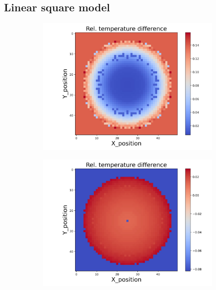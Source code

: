 \subsection{Linear square model}
\begin{figure}[h]
    \centering
    \begin{minipage}{\textwidth}
        \centering
        \begin{subfigure}{0.325\textwidth}
            \centering
            \includegraphics[width=\textwidth]{figures/raw_data/0/lin_square/T_bias.jpg}
        \end{subfigure}
        \begin{subfigure}{0.325\textwidth}
            \centering
            \includegraphics[width=\textwidth]{figures/raw_data/5/lin_square/T_bias.jpg}

\end{subfigure}
\end{minipage}
\end{figure}
